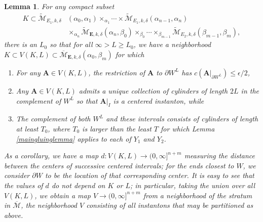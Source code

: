 \documentclass[10pt,a4paper]{amsart}
\newtheorem{lemma}[theorem]{Lemma}
\theoremstyle{definition}
\theoremstyle{remark}
\numberwithin{figure}{qchap}
\begin{document}
\begin{lemma}\label{finalbit}For any compact subset \begin{align*}K \subset \widetilde{\mathcal M}_{E_1, k, \delta}&(\alpha_0, \alpha_1) \times_{\alpha_1} \cdots \times \widetilde{\mathcal M}_{E_1, k, \delta}(\alpha_{n-1}, \alpha_n)\\
&\times_{\alpha_n} \widetilde{\mathcal M}_{\mathbf{E},k,\delta}(\alpha_n, \beta_0) \times_{\beta_0} \cdots \times_{\beta_{m-1}} \widetilde{\mathcal M}_{E_2, k, \delta}(\beta_{m-1}, \beta_m),\end{align*} there is an $L_0$ so that for all $\infty > L \geq L_0$, we have a neighborhood $K \subset V(K,L) \subset \overline{\mathcal M}_{\mathbf{E},k,\delta}(\alpha_0, \beta_m)$ for which \begin{enumerate}
\item For any $\mathbf{A} \in V(K,L)$, the restriction of $\mathbf{A}$ to $\partial W^L$ has $c(\mathbf{A}\big|_{\partial W^L}) \leq \epsilon/2$, \\
\item Any $\mathbf{A} \in V(K,L)$ admits a unique collection of cylinders of length $2L$ in the complement of $W^L$ so that $\mathbf{A}\big|_{I}$ is a centered instanton, while \\
\item The complement of both $W^L$ and these intervals consists of cylinders of length at least $T_0$, where $T_0$ is larger than the least $T$ for which Lemma \ref{maingluinglemma} applies to each of $Y_1$ and $Y_2$.
\end{enumerate}

As a corollary, we have a map $d: V(K,L) \to (0,\infty]^{n+m}$ measuring the distance between the centers of successive centered intervals; for the ends closest to $W$, we consider $\partial W$ to be the location of that corresponding center. It is easy to see that the values of $d$ do not depend on $K$ or $L$; in particular, taking the union over all $V(K, L)$, we obtain a map $V \to (0,\infty]^{n+m}$ from a neighborhood of the stratum in $\overline{\mathcal M}$, the neighborhood $V$ consisting of all instantons that may be partitioned as above.
\end{lemma}
\end{document}
